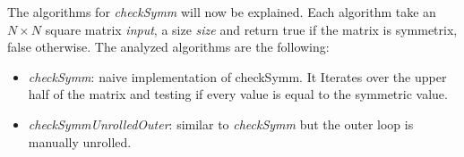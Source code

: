 \documentclass[conference]{IEEEtran}
\begin{document}
The algorithms for \textit{checkSymm} will now be explained. Each algorithm take an $N \times N$ square matrix \textit{input}, a size \textit{size} and return true if the matrix is symmetrix, false otherwise.
The analyzed algorithms are the following:
\begin{itemize}
\item \textit{checkSymm}: naive implementation of checkSymm. It Iterates over the upper half of the matrix and testing if every value is equal to the symmetric value.

  
\item \textit{checkSymmUnrolledOuter}: similar to \textit{checkSymm} but the outer loop is manually unrolled.

  

\end{itemize}
\end{document}
